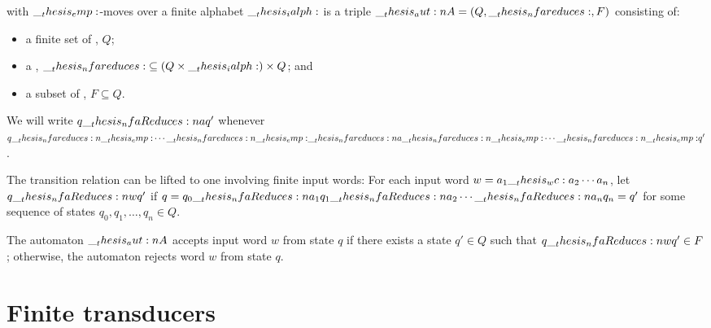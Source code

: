 \begin{definition}
   with $\__thesis_emp:$-moves over a finite alphabet $\__thesis_ialph:$ is a triple $\aut{A} = (Q, \mathord{\nfareduces}, F)$ consisting of:
  \begin{itemize}
  \item a finite set of , $Q$;
  \item a , $\mathord{\nfareduces} \subseteq (Q \times \ialph) \times Q$; and
  \item a subset of , $F \subseteq Q$.
  \end{itemize}
  We will write $q \nfaReduces[a] q'$ whenever $q \nfareduces[\emp] \dotsb \nfareduces[\emp] \nfareduces[a] \nfareduces[\emp] \dotsb \nfareduces[\emp] q'$.

  The transition relation can be lifted to one involving finite input words: For each input word $w = a_1 \wc a_2 \dotsm a_n$, let $q \nfaReduces[w] q'$ if $q = q_0 \nfaReduces[a_1] q_1 \nfaReduces[a_2] \dotsb \nfaReduces[a_n] q_n = q'$ for some sequence of states $q_0, q_1, \dotsc, q_n \in Q$.

  The automaton $\__thesis_aut:n {A}$ accepts input word $w$ from state $q$ if there exists a state $q' \in Q$ such that $q \nfaReduces[w] q' \in F$;
  otherwise, the automaton rejects word $w$ from state $q$.
\end{definition}

      

\section{Finite transducers}

